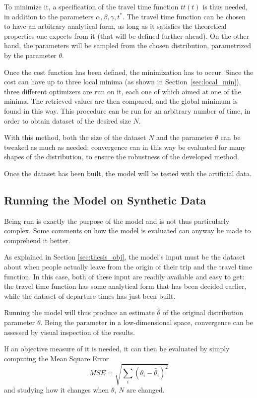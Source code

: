 To minimize it, a specification of the travel time function \(tt(t)\) is thus needed,
in addition to the parameters \(\alpha, \beta, \gamma, t^*\).
The travel time function can be chosen to have an arbitrary analytical form,
as long as it satisfies the theoretical properties one expects from it (that will be defined further ahead).
On the other hand, the parameters will be sampled from the chosen distribution,
parametrized by the parameter \(\theta\).

Once the cost function has been defined,
the minimization has to occur.
Since the cost can have up to three local minima (as shown in Section~\ref{sec:local_min}),
three different optimizers are run on it,
each one of which aimed at one of the minima.
The retrieved values are then compared, and the global minimum is found in this way.
This procedure can be run for an arbitrary number of time,
in order to obtain dataset of the desired size \(N\).

With this method, both the size of the dataset \(N\) and the parameter \(\theta\) can be tweaked as much as needed:
convergence can in this way be evaluated for many shapes of the distribution,
to ensure the robustness of the developed method.

Once the dataset has been built,
the model will be tested with the artificial data.

\subsection{Running the Model on Synthetic Data}
\label{sec:run_synth_dataset}

Being run is exactly the purpose of the model and is not thus particularly complex.
Some comments on how the model is evaluated can anyway be made to comprehend it better.

As explained in Section \ref{sec:thesis_obj},
the model's input must be the dataset about when people actually leave from the origin of their trip and the travel time function.
In this case, both of these input are readily available and easy to get:
the travel time function has some analytical form that has been decided earlier,
while the dataset of departure times has just been built.

Running the model will thus produce an estimate \(\hat{\theta}\) of the original distribution parameter \(\theta\).
Being the parameter in a low-dimensional space,
convergence can be assessed by visual inspection of the results.

If an objective measure of it is needed, it can then be evaluated by simply computing the Mean Square Error
\begin{equation*}
  MSE = \sqrt{\sum_i (\theta_i - \hat{\theta}_i)^2}
\end{equation*}
and studying how it changes when \(\theta\), \(N\) are changed.

